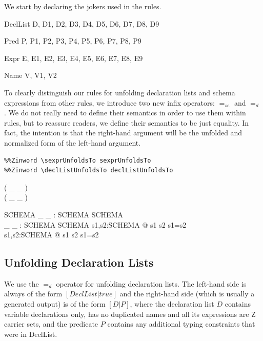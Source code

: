 \documentclass{entcs}
\newcommand{\sexprUnfoldsTo}{\mathrel{=_{se}}}
\newcommand{\declListUnfoldsTo}{\mathrel{=_d}}
\begin{document}
We start by declaring the jokers used in the rules.

\begin{zedjoker}{DeclList} D, D1, D2, D3, D4, D5, D6, D7, D8, D9 \end{zedjoker}
\begin{zedjoker}{Pred} P, P1, P2, P3, P4, P5, P6, P7, P8, P9 \end{zedjoker}
\begin{zedjoker}{Expr} E, E1, E2, E3, E4, E5, E6, E7, E8, E9 \end{zedjoker}
\begin{zedjoker}{Name} V, V1, V2 \end{zedjoker}

To clearly distinguish our rules for unfolding declaration lists and
schema expressions from other rules, we introduce two new infix
operators: $\sexprUnfoldsTo$ and $\declListUnfoldsTo$.  
We do not really need to define their semantics in order to use them within
rules, but to reassure readers, we define their semantics to be just
equality.  In fact, the intention is that the right-hand argument
will be the unfolded and normalized form of the left-hand argument.

\begin{verbatim}
%%Zinword \sexprUnfoldsTo sexprUnfoldsTo
%%Zinword \declListUnfoldsTo declListUnfoldsTo
\end{verbatim}
%
\begin{zed}
  \relation ( \_ \sexprUnfoldsTo \_ ) \\
  \relation ( \_ \declListUnfoldsTo \_ )
\end{zed}
%
\begin{gendef}{SCHEMA}
  \_ \sexprUnfoldsTo \_ : SCHEMA \rel SCHEMA \\
  \_ \declListUnfoldsTo \_ : SCHEMA \rel SCHEMA
\where
  \forall s1,s2:SCHEMA @ s1 \sexprUnfoldsTo s2 \iff s1=s2 \\
  \forall s1,s2:SCHEMA @ s1 \declListUnfoldsTo s2 \iff s1=s2 \\
\end{gendef}


\subsection{Unfolding Declaration Lists}

We use the $\declListUnfoldsTo$ operator for unfolding declaration
lists.  The left-hand side is always of the form $[DeclList|true]$ and
the right-hand side (which is usually a generated output) is of the
form $[D|P]$, where the declaration list $D$ contains variable
declarations only, has no duplicated names and all its expressions are
Z carrier sets, and the predicate $P$ contains any additional typing
constraints that were in DeclList.
\end{document}
